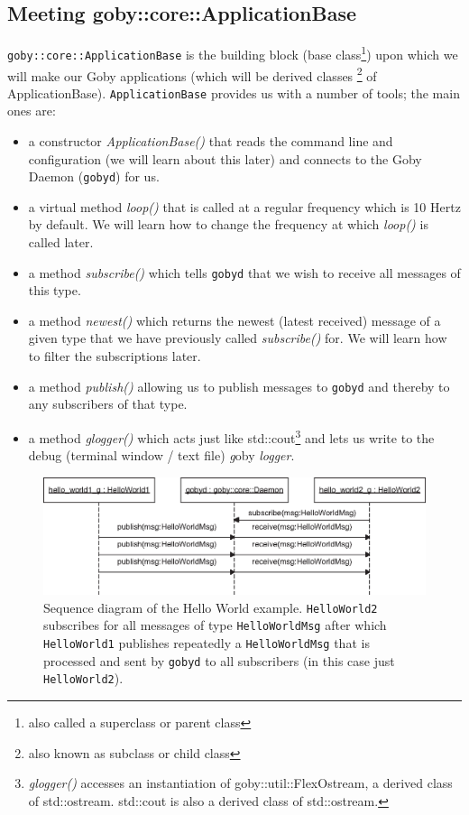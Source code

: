 \documentclass[11pt, letterpaper]{article}
\begin{document}
\subsection{Meeting goby::core::ApplicationBase}

\texttt{goby::core::ApplicationBase} is the building block (base class\footnote{also called a superclass or parent class}) upon which we will make our Goby applications (which will be derived classes \footnote{also known as subclass or child class} of ApplicationBase). \texttt{ApplicationBase} provides us with a number of tools; the main ones are:

\begin{itemize}
\item a constructor \textit{ApplicationBase()} that reads the command line and configuration (we will learn about this later) and connects to the Goby Daemon (\texttt{gobyd}) for us.
\item a virtual method \textit{loop()} that is called at a regular frequency which is 10 Hertz by default. We will learn how to change the frequency at which \textit{loop()} is called later. 
\item a method \textit{subscribe()} which tells \texttt{gobyd} that we wish to receive all messages of this type.
\item a method \textit{newest()} which returns the newest (latest received) message of a given type that we have previously called \textit{subscribe()} for. We will learn how to filter the subscriptions later.
\item a method \textit{publish()} allowing us to publish messages to \texttt{gobyd} and thereby to any subscribers of that type.
\item a method \textit{glogger()} which acts just like std::cout\footnote{\textit{glogger()} accesses an instantiation of goby::util::FlexOstream, a derived class of std::ostream. std::cout is also a derived class of std::ostream.} and lets us write to the debug (terminal window / text file) \textit{g}oby \textit{logger}.
\end{itemize}


\begin{figure}
\centering
\includegraphics[scale=0.9]{hello_world_sequence}
\caption{Sequence diagram of the Hello World example. \texttt{HelloWorld2} subscribes for all messages of type \texttt{HelloWorldMsg} after which \texttt{HelloWorld1} publishes repeatedly a \texttt{HelloWorldMsg} that is processed and sent by \texttt{gobyd} to all subscribers (in this case just \texttt{HelloWorld2}).}
\label{fig:hellow_world_sequence}
\end{figure}
\end{document}

